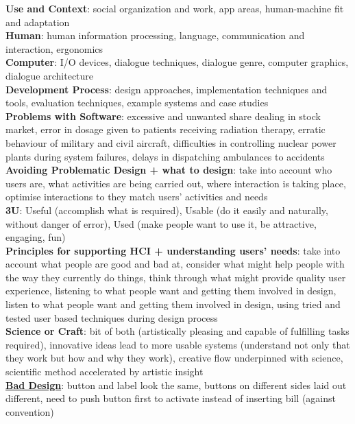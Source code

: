 \documentclass[a4paper]{article}
\begin{document}
\begin{multicols}{2}
        \textbf{Use and Context}: social organization and work, app areas, human-machine fit and adaptation\\
        \textbf{Human}: human information processing, language, communication and interaction, ergonomics\\
        \textbf{Computer}: I/O devices, dialogue techniques, dialogue genre, computer graphics, dialogue architecture\\
        \textbf{Development Process}: design approaches, implementation techniques and tools, evaluation techniques, example systems and case studies\\
        \textbf{Problems with Software}: excessive and unwanted share dealing in stock market, error in dosage given to patients receiving radiation therapy, erratic behaviour of military and civil aircraft, difficulties in controlling nuclear power plants during system failures, delays in dispatching ambulances to accidents\\
        \textbf{Avoiding Problematic Design + what to design}: take into account who users are, what activities are being carried out, where interaction is taking place, optimise interactions to they match users' activities and needs\\
        \textbf{3U}: Useful (accomplish what is required), Usable (do it easily and naturally, without danger of error), Used (make people want to use it, be attractive, engaging, fun)\\
        \textbf{Principles for supporting HCI + understanding users' needs}: take into account what people are good and bad at, consider what might help people with the way they currently do things, think through what might provide quality user experience, listening to what people want and getting them involved in design, listen to what people want and getting them involved in design, using tried and tested user based techniques during design process\\
        \textbf{Science or Craft}: bit of both (artistically pleasing and capable of fulfilling tasks required), innovative ideas lead to more usable systems (understand not only that they work but how and why they work), creative flow underpinned with science, scientific method accelerated by artistic insight\\
        \underline{\textbf{Bad Design}}: button and label look the same, buttons on different sides laid out different, need to push button first to activate instead of inserting bill (against convention)\\

\end{multicols}
\end{document}
